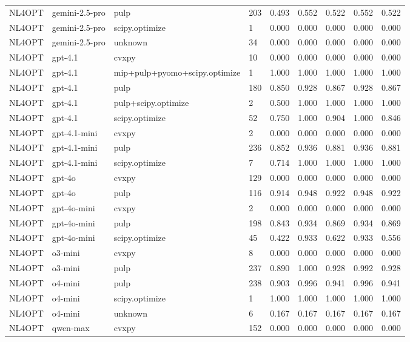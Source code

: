 \begin{table}[t]
\begin{tabular}{lllllllll}
NL4OPT & gemini-2.5-pro & pulp & 203 & 0.493 & 0.552 & 0.522 & 0.552 & 0.522 \\
NL4OPT & gemini-2.5-pro & scipy.optimize & 1 & 0.000 & 0.000 & 0.000 & 0.000 & 0.000 \\
NL4OPT & gemini-2.5-pro & unknown & 34 & 0.000 & 0.000 & 0.000 & 0.000 & 0.000 \\
NL4OPT & gpt-4.1 & cvxpy & 10 & 0.000 & 0.000 & 0.000 & 0.000 & 0.000 \\
NL4OPT & gpt-4.1 & mip+pulp+pyomo+scipy.optimize & 1 & 1.000 & 1.000 & 1.000 & 1.000 & 1.000 \\
NL4OPT & gpt-4.1 & pulp & 180 & 0.850 & 0.928 & 0.867 & 0.928 & 0.867 \\
NL4OPT & gpt-4.1 & pulp+scipy.optimize & 2 & 0.500 & 1.000 & 1.000 & 1.000 & 1.000 \\
NL4OPT & gpt-4.1 & scipy.optimize & 52 & 0.750 & 1.000 & 0.904 & 1.000 & 0.846 \\
NL4OPT & gpt-4.1-mini & cvxpy & 2 & 0.000 & 0.000 & 0.000 & 0.000 & 0.000 \\
NL4OPT & gpt-4.1-mini & pulp & 236 & 0.852 & 0.936 & 0.881 & 0.936 & 0.881 \\
NL4OPT & gpt-4.1-mini & scipy.optimize & 7 & 0.714 & 1.000 & 1.000 & 1.000 & 1.000 \\
NL4OPT & gpt-4o & cvxpy & 129 & 0.000 & 0.000 & 0.000 & 0.000 & 0.000 \\
NL4OPT & gpt-4o & pulp & 116 & 0.914 & 0.948 & 0.922 & 0.948 & 0.922 \\
NL4OPT & gpt-4o-mini & cvxpy & 2 & 0.000 & 0.000 & 0.000 & 0.000 & 0.000 \\
NL4OPT & gpt-4o-mini & pulp & 198 & 0.843 & 0.934 & 0.869 & 0.934 & 0.869 \\
NL4OPT & gpt-4o-mini & scipy.optimize & 45 & 0.422 & 0.933 & 0.622 & 0.933 & 0.556 \\
NL4OPT & o3-mini & cvxpy & 8 & 0.000 & 0.000 & 0.000 & 0.000 & 0.000 \\
NL4OPT & o3-mini & pulp & 237 & 0.890 & 1.000 & 0.928 & 0.992 & 0.928 \\
NL4OPT & o4-mini & pulp & 238 & 0.903 & 0.996 & 0.941 & 0.996 & 0.941 \\
NL4OPT & o4-mini & scipy.optimize & 1 & 1.000 & 1.000 & 1.000 & 1.000 & 1.000 \\
NL4OPT & o4-mini & unknown & 6 & 0.167 & 0.167 & 0.167 & 0.167 & 0.167 \\
NL4OPT & qwen-max & cvxpy & 152 & 0.000 & 0.000 & 0.000 & 0.000 & 0.000 \\

\end{tabular}
\end{table}
